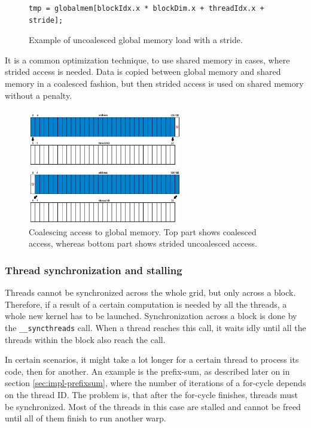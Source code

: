 \begin{figure}[ht]
\begin{verbatim}
tmp = globalmem[blockIdx.x * blockDim.x + threadIdx.x + stride];
\end{verbatim}
\caption{Example of uncoalesced global memory load with a stride.}\label{code:uncoalesced}
\end{figure}

It is a common optimization technique, to use shared memory in cases, where strided access is needed. Data is copied between global memory and shared memory in a coalesced fashion, but then strided access is used on shared memory without a penalty.

\FloatBarrier

\begin{center}
\begin{figure}[ht]
	\centering\includegraphics[width=0.6\textwidth]{fig/coalescing.png}
	\caption{Coalescing access to global memory. Top part shows coalesced access, whereas bottom part shows strided uncoalesced access.}\label{fig:coalescing}
\end{figure}
\end{center}

\subsubsection{Thread synchronization and stalling}\label{subsubsec:cuda-thread-sync-stall}

Threads cannot be synchronized across the whole grid, but only across a block. Therefore, if a result of a certain computation is needed by all the threads, a whole new kernel has to be launched. Synchronization across a block is done by the \verb|__syncthreads| call. When a thread reaches this call, it waits idly until all the threads within the block also reach the call.

In certain scenarios, it might take a lot longer for a certain thread to process its code, then for another. An example is the prefix-sum, as described later on in section \ref{sec:impl-prefixsum}, where the number of iterations of a for-cycle depends on the thread ID. The problem is, that after the for-cycle finishes, threads must be synchronized. Most of the threads in this case are stalled and cannot be freed until all of them finish to run another warp.

